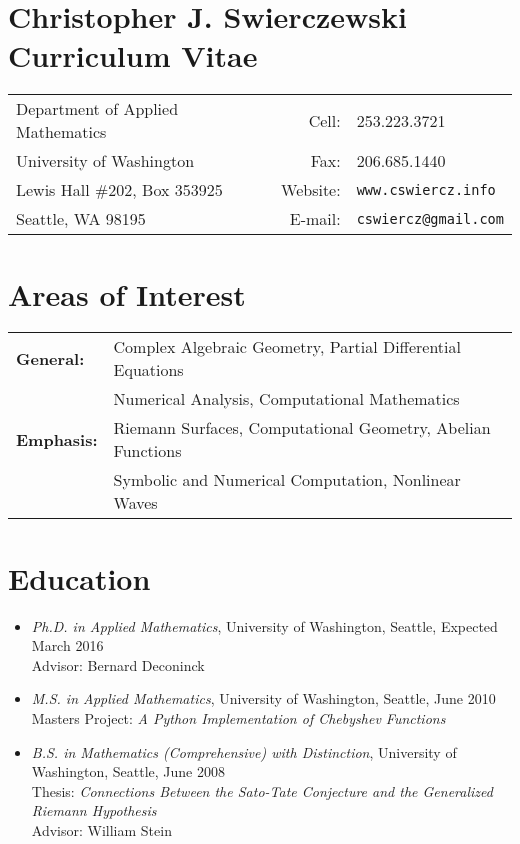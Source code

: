 \documentclass{article}
\begin{document}

\section*{Christopher J. Swierczewski \hspace{4.9cm} Curriculum Vitae}

\begin{tabular}{lrl}
  Department of Applied Mathematics \hspace{5cm} & Cell: & 253.223.3721 \\
  University of Washington                       & Fax:     & 206.685.1440 \\
  Lewis Hall \#202, Box 353925        & Website: & \tt www.cswiercz.info \\
  Seattle, WA 98195                   & E-mail:  & \tt cswiercz@gmail.com
\end{tabular}




\section*{Areas of Interest}

\begin{tabular}{ll}
  \bf General: & Complex Algebraic Geometry, Partial Differential Equations \\
         & Numerical Analysis, Computational Mathematics \\
  \bf Emphasis: & Riemann Surfaces, Computational Geometry, Abelian Functions\\
                & Symbolic and Numerical Computation, Nonlinear Waves
\end{tabular}



\section*{Education}



\begin{itemize}
  \item {\it Ph.D. in Applied Mathematics}, University of Washington,
    Seattle, Expected March 2016 \\ Advisor: Bernard Deconinck
  \item {\it M.S. in Applied Mathematics}, University of Washington,
    Seattle, June 2010 \\ Masters Project: {\it A Python Implementation
      of Chebyshev Functions}
  \item {\it B.S. in Mathematics (Comprehensive) with Distinction},
    University of Washington, Seattle, June 2008 \\ Thesis: {\it
      Connections Between the Sato-Tate Conjecture and the Generalized
      Riemann Hypothesis} \\ Advisor: William Stein
\end{itemize}
\end{document}
